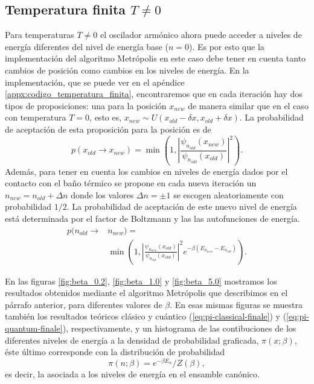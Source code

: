 \documentclass[%
 reprint,
 amsmath,amssymb,
 aps,
 pra,
]{revtex4-2}
\begin{document}
\subsection{Temperatura finita \texorpdfstring{$T \neq 0$}{T diferente de cero}\label{subsec:temperatura-finita}}
Para temperaturas $T\neq0$ el oscilador armónico ahora puede acceder a niveles de energía diferentes del nivel de energía base  ($n=0$). Es por esto que la implementación del algoritmo Metrópolis en este caso debe tener en cuenta tanto cambios de posición como cambios en los niveles de energía. En la implementación, que se puede ver en el apéndice \ref{appx:codigo_temperatura_finita}, encontraremos que en cada iteración hay dos tipos de proposiciones: una para la posición $x_{new}$ de manera similar que en el caso con temperatura $T=0$, esto es, $x_{new} \sim U(x_{old} - \delta x, x_{old} + \delta x)$. La probabilidad de aceptación de esta proposición para la posición es de 
\begin{equation}
	p(x_{old} \rightarrow x_{new}) = \min\left(1,\left|\frac{\psi_{n_{old}}(x_{new})}{\psi_{n_{old}}(x_{old})}\right|^2\right).
\end{equation}
Además, para tener en cuenta los cambios en niveles de energía dados por el contacto con el baño térmico se propone en cada nueva iteración un $n_{new}=n_{old} + \Delta n$ donde los valores $\Delta n = \pm 1$ se escogen aleatoriamente con probabilidad $1/2$. La probabilidad de aceptación de este nuevo nivel de energía está determinada por el factor de Boltzmann y las las autofunciones de energía.
\begin{align}
	p(n_{old} \rightarrow 	& n_{new}) = \nonumber \\
							& \min\left(1,\left|\frac{\psi_{n_{new}}(x_{old})}{\psi_{n_{old}}(x_{old})}\right|^2 e^{-\beta\left(E_{n_{new}}-E_{n_{old}}\right)}\right).
\end{align}

En las figuras \ref{fig:beta_0.2}, \ref{fig:beta_1.0} y \ref{fig:beta_5.0} mostramos los resultados obtenidos mediante el algoritmo Metrópolis que describimos en el párrafo anterior, para diferentes valores de $\beta$. En esas mismas figuras se muestra también los resultados teóricos clásico y cuántico (\ref{eq:pi-classical-finale}) y (\ref{eq:pi-quantum-finale}), respectivamente, y un histograma de las contibuciones de los diferentes niveles de energía a la densidad de probabilidad graficada, $\pi(x;\beta)$, éste último corresponde con la 	distribución de probabilidad 
\begin{equation}
\pi(n;\beta)=e^{-\beta E_n }/Z(\beta),  \label{eq:pi-energy-levels}
\end{equation}
es decir, la asociada a los niveles de energía en el ensamble canónico.
\end{document}
